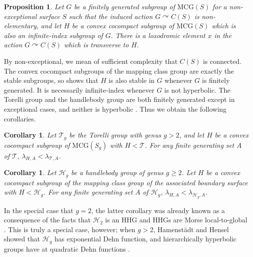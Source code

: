 \documentclass[11pt,letterpaper]{amsart}
\newtheorem{corollary}[theorem]{Corollary}
\newtheorem{proposition}[theorem]{Proposition}
\theoremstyle{definition}
\theoremstyle{plain}
\theoremstyle{TheoremNum}
\begin{document}

\begin{proposition}\label{prop:subgroup-transverse}
    Let $G$ be a finitely generated subgroup of $\mathrm{MCG}(S)$ for a non-exceptional surface $S$ such that the induced action $G \curvearrowright C(S)$ is non-elementary, and let $H$ be a convex cocompact subgroup of $\mathrm{MCG}(S)$ which is also an infinite-index subgroup of $G$. There is a loxodromic element $x$ in the action $G \curvearrowright C(S)$ which is transverse to $H$.
\end{proposition}
By non-exceptional, we mean of sufficient complexity that $C(S)$ is connected. The convex cocompact subgroups of the mapping class group are exactly the stable subgroups, so \cite[Theorem~1.6]{Aougab-Durham-Taylor-OutFn} shows that $H$ is also stable in $G$ whenever $G$ is finitely generated. It is necessarily infinite-index whenever $G$ is not hyperbolic. The Torelli group and the handlebody group are both finitely generated except in exceptional cases, and neither is hyperbolic \cite{Wajnryb-handlebody-pres,Suzuki-handlebody-pres,Johnson-Torelli-one,Johnson-Torelli-three}. Thus we obtain the following corollaries.
\begin{corollary}
    Let $\mathcal{T}_g$ be the Torelli group with genus $g >2$, and let $H$ be a convex cocompact subgroup of $\mathrm{MCG}(S_g)$ with $H < \mathcal{T}$. For any finite generating set $A$ of $\mathcal{T}$, $\lambda_{H,A} < \lambda_{\mathcal{T}, A}$.
\end{corollary}
\begin{corollary}
    Let $\mathcal{H}_g$ be a handlebody group of genus $g \geq 2$. Let $H$ be a convex cocompact subgroup of the mapping class group of the associated boundary surface with $H < \mathcal{H}_g$. For any finite generating set $A$ of $\mathcal{H}_g$, $\lambda_{H,A} < \lambda_{\mathcal{H}_g, A}$.
\end{corollary}
In the special case that $g = 2$, the latter corollary was already known as a consequence of the facts that $\mathcal{H}_2$ is an HHG and HHGs are Morse local-to-global \cite{Chesser-handlebody-not-HHG,RST}. This is truly a special case, however; when $g > 2$, Hamenst\"{a}dt and Hensel showed that $\mathcal{H}_g$ has exponential Dehn function, and hierarchically hyperbolic groups have at quadratic Dehn functions \cite{hamenstadt-hensel-handlebody,HHS2}.
\end{document}
